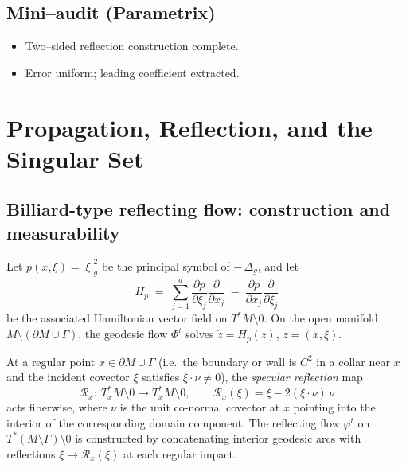 \subsection*{Mini–audit (Parametrix)}
\begin{itemize}
  \item Two–sided reflection construction complete.
  \item Error uniform; leading coefficient extracted.
\end{itemize}


\section{Propagation, Reflection, and the Singular Set}
\label{sec:propagation}

\subsection{Billiard-type reflecting flow: construction and measurability}
Let $p(x,\xi)=|\xi|_g^2$ be the principal symbol of $-\,\Delta_g$, and let
\[
H_p \;=\; \sum_{j=1}^d \frac{\partial p}{\partial \xi_j}\frac{\partial}{\partial x_j}
   \;-\; \frac{\partial p}{\partial x_j}\frac{\partial}{\partial \xi_j}
\]
be the associated Hamiltonian vector field on $T^*M\setminus 0$. On the open manifold $M\setminus (\partial M\cup\Gamma)$, the geodesic flow $\Phi^t$ solves $\dot z = H_p(z)$, $z=(x,\xi)$.

At a regular point $x\in\partial M\cup\Gamma$ (i.e.\ the boundary or wall is $C^2$ in a collar near $x$ and the incident covector $\xi$ satisfies $\xi\cdot \nu\neq 0$), the \emph{specular reflection} map
\[
\mathcal R_x:\ T_x^*M\setminus 0 \to T_x^*M\setminus 0, 
\qquad \mathcal R_x(\xi)=\xi-2(\xi\cdot \nu)\,\nu
\]
acts fiberwise, where $\nu$ is the unit co-normal covector at $x$ pointing into the interior of the corresponding domain component. The reflecting flow $\varphi^t$ on $T^*(M\setminus\Gamma)\setminus 0$ is constructed by concatenating interior geodesic arcs with reflections $\xi\mapsto \mathcal R_x(\xi)$ at each regular impact.


